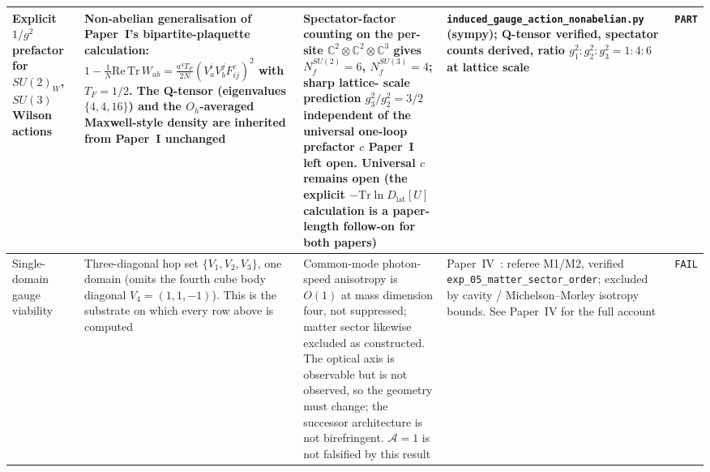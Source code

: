 {\begin{longtable}{@{}p{3.2cm}p{3.6cm}p{3.4cm}p{3.8cm}p{1.0cm}@{}}
Explicit $1/g^2$ prefactor for $SU(2)_W$, $SU(3)$ Wilson actions
    & Non-abelian generalisation of Paper~I's bipartite-plaquette
      calculation: $1 - \tfrac{1}{N}\mathrm{Re}\,\mathrm{Tr}\,W_{ab} =
      \tfrac{a^4 T_F}{2N}(V_a^i V_b^j F^c_{ij})^2$ with $T_F = 1/2$.
      The Q-tensor (eigenvalues $\{4, 4, 16\}$) and the
      $O_h$-averaged Maxwell-style density are inherited from
      Paper~I unchanged
    & Spectator-factor counting on the per-site
      $\mathbb{C}^2 \otimes \mathbb{C}^2 \otimes \mathbb{C}^3$
      gives $N_f^{SU(2)} = 6$, $N_f^{SU(3)} = 4$; sharp lattice-
      scale prediction $g_3^2/g_2^2 = 3/2$ independent of the
      universal one-loop prefactor $c$ Paper~I left open.
      Universal $c$ remains open (the explicit
      $-\mathrm{Tr}\ln D_\text{lat}[U]$ calculation is a
      paper-length follow-on for both papers)
    & \nolinkurl{induced_gauge_action_nonabelian.py} (sympy);
      Q-tensor verified, spectator counts derived, ratio
      $g_1^2 : g_2^2 : g_3^2 = 1 : 4 : 6$ at lattice scale
    & \texttt{PART} \\

\hline
Single-domain gauge viability
    & Three-diagonal hop set $\{V_1, V_2, V_3\}$, one domain
      (omits the fourth cube body diagonal $V_4 = (1,1,-1)$).
      This is the substrate on which every row above is computed
    & Common-mode photon-speed anisotropy is $O(1)$ at mass
      dimension four, not suppressed; matter sector likewise
      excluded as constructed.  The optical axis is observable
      but is not observed, so the geometry must change; the
      successor architecture is not birefringent.
      $\mathcal{A}=1$ is not falsified by this result
    & Paper~IV~\cite{menendez2026opticalaxis}: referee M1/M2,
      verified \nolinkurl{exp_05_matter_sector_order};
      excluded by cavity / Michelson--Morley isotropy bounds.
      See Paper~IV for the full account
    & \texttt{FAIL} \\


\end{longtable}}
